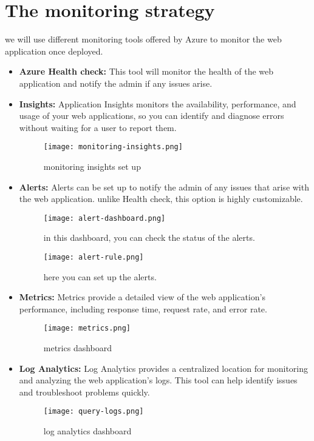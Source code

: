 \section{The monitoring strategy \cite{webArticle7}}
we will use different monitoring tools offered by Azure to monitor the web application once deployed.
\begin{itemize}
    \item \textbf{Azure Health check:} This tool will monitor the health of the web application and notify the admin if any issues arise.
    \item \textbf{Insights:} Application Insights monitors the availability, performance, and usage of your web applications, so you can identify and diagnose errors without waiting for a user to report them.

    \begin{figure}[htbp]
        \centering
        \texttt{[image: monitoring-insights.png]}
        \caption{monitoring insights set up}
        \label{fig:monitoring-insights}
    \end{figure}

    \item \textbf{Alerts:} Alerts can be set up to notify the admin of any issues that arise with the web application. unlike Health check, this option is highly customizable.

    \begin{figure}[htbp]
        \centering
        \texttt{[image: alert-dashboard.png]}
        \caption{in this dashboard, you can check the status of the alerts.}
        \label{fig:monitoring-alerts}
    \end{figure}

    \begin{figure}[htbp]
        \centering
        \texttt{[image: alert-rule.png]}
        \caption{here you can set up the alerts.}
        \label{fig:monitoring-set-up-alerts}
    \end{figure}

    \item \textbf{Metrics:} Metrics provide a detailed view of the web application's performance, including response time, request rate, and error rate.

    \begin{figure}[htbp]
        \centering
        \texttt{[image: metrics.png]}
        \caption{metrics dashboard}
        \label{fig:monitoring-metrics}
    \end{figure}

    \item \textbf{Log Analytics:} Log Analytics provides a centralized location for monitoring and analyzing the web application's logs. This tool can help identify issues and troubleshoot problems quickly.

    \begin{figure}[htbp]
        \centering
        \texttt{[image: query-logs.png]}
        \caption{log analytics dashboard}
        \label{fig:monitoring-log-analytics}
    \end{figure}

\end{itemize}
\pagebreak
